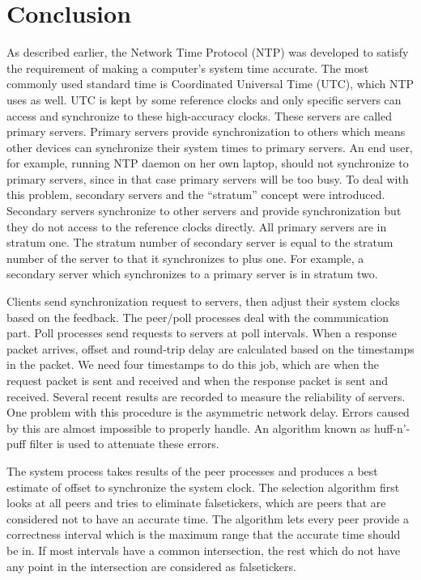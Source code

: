 
\chapter{Conclusion}
\label{cha:conclusion}

As described earlier, the Network Time Protocol (NTP) was developed to satisfy the
requirement of making a computer's system time accurate. The most commonly used
standard time is Coordinated Universal Time (UTC), which NTP uses as well.
UTC is kept by some reference clocks and only specific servers can access and
synchronize to these high-accuracy clocks. These servers are called primary
servers. Primary servers
provide synchronization to others which means other devices can synchronize
their system times to primary servers. An end user, for example, 
running NTP daemon on her own laptop, should not synchronize to
primary servers, since in that case primary servers will be too busy. To deal
with this problem, secondary servers and the ``stratum'' concept were
introduced.
Secondary servers synchronize to other servers and provide synchronization but
they do not access to the reference clocks directly.   All primary servers are
in stratum one. The stratum number of
secondary server is equal to the stratum number of the server to that it synchronizes
to plus one. For example, a secondary server which synchronizes to a primary
server is in stratum two. 

Clients send synchronization request to servers, then adjust their
system clocks based on the feedback. The peer/poll processes deal with the
communication part. Poll processes send requests to servers at poll intervals.
When a response packet arrives, offset and round-trip delay are calculated
based on the timestamps in the packet. We need four timestamps to do this job,
which are when the request packet is sent and received and when the response
packet is sent and received. Several recent results are recorded to measure
the reliability of servers. One problem with this procedure is the asymmetric
network delay.  Errors caused by this are almost impossible to properly handle.
An algorithm known as huff-n'-puff filter is used to attenuate these errors.

The system process takes results of the peer processes and produces a best
estimate of offset to synchronize the system clock. The selection algorithm
first looks at all peers and tries to eliminate falsetickers, which are peers
that are considered not to have an accurate time. The algorithm lets every peer
provide a correctness interval which is the maximum range that the accurate
time should be in. If most intervals have a common intersection, the rest which
do not have any point in the intersection are considered as falsetickers. 

